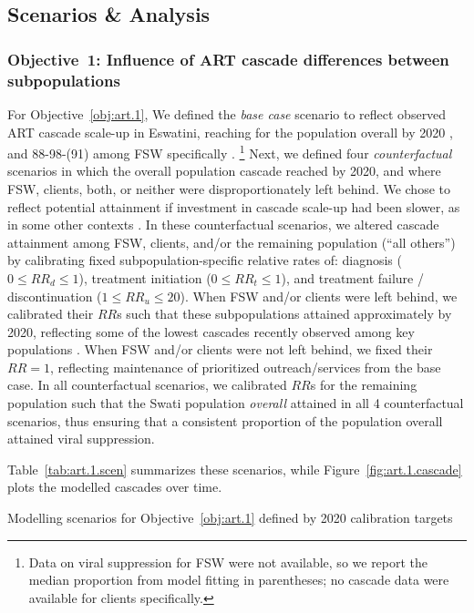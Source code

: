 \subsection{Scenarios \& Analysis}\label{art.meth.obj}
\subsubsection{Objective~1: Influence of ART cascade differences between subpopulations}\label{art.meth.obj.1}
For Objective~\ref{obj:art.1},
We defined the \emph{base case} scenario to reflect
observed ART cascade scale-up in Eswatini, reaching
\cashi for the population overall by 2020 \cite{SHIMS3}, and
88-98-(91) among FSW specifically \cite{EswIBBS2022}.%
\footnote{Data on viral suppression for FSW were not available,
  so we report the median proportion from model fitting in parentheses;
  no cascade data were available for clients specifically.}
Next, we defined four \emph{counterfactual} scenarios in which
the overall population cascade reached \casmd by 2020,
and where FSW, clients, both, or neither were disproportionately left behind.
We chose \casmd to reflect potential attainment if
investment in cascade scale-up had been slower,
as in some other contexts \cite{UNAIDS2023}.
In these counterfactual scenarios, we altered cascade attainment among
FSW, clients, and/or the remaining population (``all others'') by calibrating
fixed subpopulation-specific relative rates of:
diagnosis ($0 \le {RR}_d \le 1$),
treatment initiation ($0 \le {RR}_t \le 1$), and
treatment failure / discontinuation ($1 \le {RR}_u \le 20$).
When FSW and/or clients were left behind, we calibrated their $RR$s such that
these subpopulations attained approximately \caslo by 2020, reflecting
some of the lowest cascades recently observed among key populations \cite{Hakim2018}.
When FSW and/or clients were not left behind, we fixed their $RR=1$,
reflecting maintenance of prioritized outreach/services from the base case.
In all counterfactual scenarios, we calibrated $RR$s for the remaining population such that
the Swati population \emph{overall} attained \casmd in all 4 counterfactual scenarios,
thus ensuring that a consistent proportion of the population overall
attained viral suppression.
\par
Table~\ref{tab:art.1.scen} summarizes these scenarios, while
Figure~\ref{fig:art.1.cascade} plots the modelled cascades over time.
\begin{table}
  \centering
  \caption{Modelling scenarios for Objective~\ref{obj:art.1} defined by 2020 calibration targets}
  \label{tab:art.1.scen}
  
\end{table}
